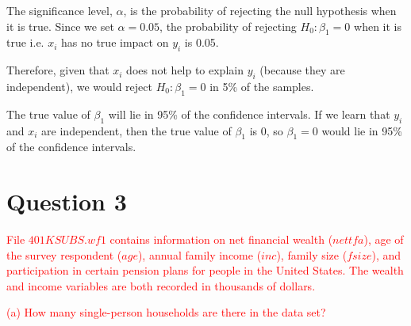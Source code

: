\documentclass[12pt]{report}
\begin{document}
\noindent The significance level, $\alpha$, is the probability of rejecting the null hypothesis when it is true. Since we set $\alpha = 0.05$, the probability of rejecting $H_0: \beta_1=0$ when it is true i.e. $x_i$ has no true impact on $y_i$ is 0.05.

\noindent Therefore, given that $x_i$ does not help to explain $y_i$ (because they are independent), we would reject $H_0: \beta_1=0$ in 5\% of the samples.

\noindent The true value of $\beta_1$ will lie in 95\% of the confidence intervals. If we learn that $y_i$ and $x_i$ are independent, then the true value of $\beta_1$ is $0$, so $\beta_1 = 0$ would lie in 95\% of the confidence intervals.

\newpage
\section*{Question 3}
\noindent \textcolor{red}{File $401KSUBS.wf1$ contains information on net financial wealth ($nettfa$), age of the survey respondent ($age$), annual family income ($inc$), family size ($fsize$), and participation in certain pension plans for people in the United States. The wealth and income variables are both recorded in thousands of dollars.}

\noindent \textcolor{red}{(a) How many single-person households are there in the data set?}
\end{document}
